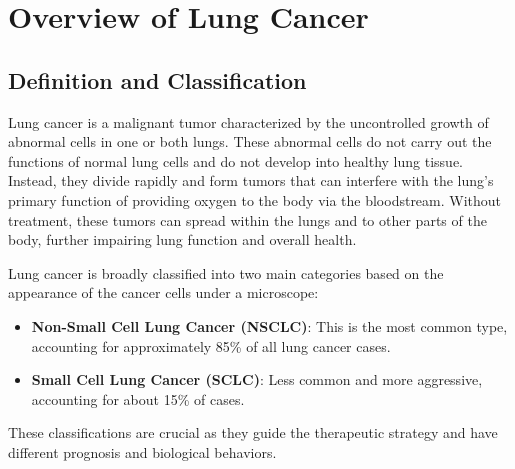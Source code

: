 
\section{Overview of Lung Cancer}


\subsection{Definition and Classification}
Lung cancer is a malignant tumor characterized by the uncontrolled growth of abnormal cells in one 
or both lungs. These abnormal cells do not carry out the functions of normal lung cells and do not 
develop into healthy lung tissue. Instead, they divide rapidly and form tumors that can interfere 
with the lung’s primary function of providing oxygen to the body via the bloodstream. Without 
treatment, these tumors can spread within the lungs and to other parts of the body, further 
impairing lung function and overall health.

Lung cancer is broadly classified into two main categories based on the appearance of the cancer 
cells under a microscope:
\begin{itemize}
    \item \textbf{Non-Small Cell Lung Cancer (NSCLC)}: This is the most common type, accounting for 
    approximately 85\% of all lung cancer cases.

    \item \textbf{Small Cell Lung Cancer (SCLC)}: Less common and more aggressive, accounting for 
    about 15\% of cases.
\end{itemize}
These classifications are crucial as they guide the therapeutic strategy and have different 
prognosis and biological behaviors.

